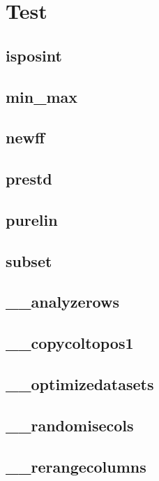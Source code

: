 \chapter{Test}

\section{isposint}

\section{min\_max}

\section{newff}

\section{prestd}

\section{purelin}

\section{subset}

\section{\_\_analyzerows}

\section{\_\_copycoltopos1}

\section{\_\_optimizedatasets}

\section{\_\_randomisecols}

\section{\_\_rerangecolumns}

